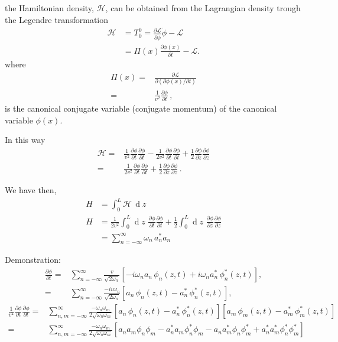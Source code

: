\begin{frame}
the Hamiltonian density, $\mathcal{H}$, can be obtained from the Lagrangian density trough the Legendre transformation
\begin{align}
\mathcal{H}&=T^0_0=\frac{\partial\mathcal{L}}{\partial\dot{\phi}}\dot{\phi}
      -\mathcal{L}\\
      &=\Pi(x)\frac{\partial\phi(x)}{\partial t}-\mathcal{L}.
\end{align}
where
\begin{align}
\label{eq:11}
  \Pi(x)=&\frac{\partial\mathcal{L}}{\partial(\partial\phi(x)/\partial t)} \nonumber\\
      =& \frac{1}{v^2}\frac{\partial\phi}{\partial t}\,,
\end{align}
is the canonical conjugate variable (conjugate momentum) of  the canonical variable $\phi(x)$.

In this way
\begin{align}
  \mathcal{H}=&\frac{1}{v^2}\frac{\partial\phi}{\partial t}\frac{\partial\phi}{\partial t}-\frac{1}{2v^2}\frac{\partial\phi}{\partial t}\frac{\partial\phi}{\partial t}+\frac{1}{2}\frac{\partial\phi}{\partial z}\frac{\partial\phi}{\partial z} \nonumber\\
=&\frac{1}{2v^2}\frac{\partial\phi}{\partial t}\frac{\partial\phi}{\partial t}+\frac{1}{2}\frac{\partial\phi}{\partial z}\frac{\partial\phi}{\partial z}\,.
\end{align}

We have then,
\begin{align}
  \label{eq:12}
  H&=\int_{0}^{L}\mathcal{H}\,\operatorname{d}z \nonumber\\
  H&=\frac{1}{2v^2}\int_0^L\operatorname{d}z\,\,\frac{\partial\phi}{\partial t}\frac{\partial\phi}{\partial t}+
  \frac{1}{2}\int_0^L\operatorname{d}z\,\,\frac{\partial\phi}{\partial z}\frac{\partial\phi}{\partial z}\nonumber\\
&=\sum_{n=-\infty}^\infty\omega_n\,a_n^*a_n
\end{align}
\end{frame}
Demonstration:
\begin{align}
  \frac{\partial\phi}{\partial t}=&\sum_{n=-\infty}^\infty \frac{v}{\sqrt{2\omega_n}}
  \left[-i\omega_n a_n\,\phi_n(z,t)+i\omega_n a_n^*\,\phi_n^*(z,t)\right],\nonumber\\
=&\sum_{n=-\infty}^\infty\frac{-i v\omega_n}{\sqrt{2\omega_n}}
  \left[a_n\,\phi_n(z,t)- a_n^*\,\phi_n^*(z,t)\right],
\end{align}
\begin{align}
\frac{1}{v^2}   \frac{\partial\phi}{\partial t} \frac{\partial\phi}{\partial t}=&
\sum_{n,m=-\infty}^\infty\frac{- \omega_n\omega_m}{2\sqrt{\omega_n\omega_m}}
  \left[a_n\,\phi_n(z,t)- a_n^*\,\phi_n^*(z,t)\right]
\left[a_m\,\phi_m(z,t)- a_m^*\,\phi_m^*(z,t)\right]\\
=  &
\sum_{n,m=-\infty}^\infty\frac{- \omega_n\omega_m}{2\sqrt{\omega_n\omega_m}}
  \left[a_n a_m \phi_n \phi_m- a_n^*a_m\phi_n^*\phi_m-a_n a_m^* \phi_n \phi_m^*+ a_n^*a_m^*\phi_n^*\phi_m^*\right]
\end{align}

